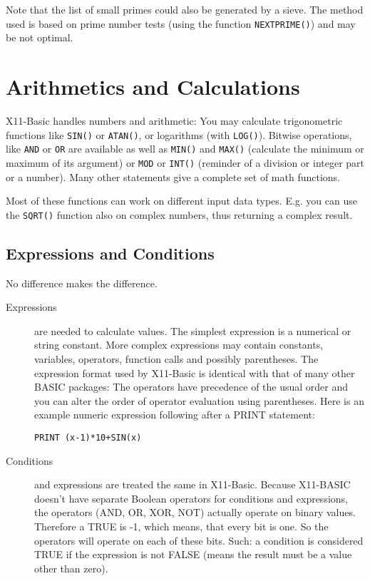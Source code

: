 Note that the list of small primes could also be generated by a sieve. The method  used
is based on prime number tests (using the function \verb|NEXTPRIME()|) and may be not
optimal.

\section{Arithmetics and Calculations}

X11-Basic handles numbers and arithmetic: You may calculate trigonometric
functions like \verb|SIN()| or \verb|ATAN()|, or logarithms (with \verb|LOG()|).
Bitwise operations, like \verb|AND| or \verb|OR| are available as well as
\verb|MIN()| and \verb|MAX()| (calculate the minimum or maximum of its argument)
or \verb|MOD| or \verb|INT()| (reminder of a division or integer part or a
number). Many other statements give a complete set of math functions. 

Most of these functions can work on different input data types. E.g. you can use the 
\verb|SQRT()| function also on complex numbers, thus returning a complex result. 

\subsection{Expressions and Conditions}
No difference makes the difference.
\begin{description}
\item[Expressions] are needed to calculate values. The simplest expression is a
numerical or string constant. More complex expressions may contain constants,
variables, operators, function calls and possibly parentheses. The expression
format used by X11-Basic is identical with that of many other BASIC packages:
The operators have precedence of the usual order and you can alter the order of
operator evaluation using parentheses. Here is an example numeric expression
following after a PRINT statement:
\begin{mdframed}[hidealllines=true,backgroundcolor=blue!20]
\begin{verbatim}
PRINT (x-1)*10+SIN(x)
\end{verbatim}
\end{mdframed}
\item[Conditions] and expressions are treated the same in X11-Basic. Because
X11-BASIC doesn't have separate Boolean operators for conditions and 
expressions, the operators (AND, OR, XOR, NOT) actually operate on binary
values. Therefore a TRUE is -1, which means, that every bit is one. So the
operators will operate on each of these bits. Such: a condition is considered
TRUE if the expression is not FALSE (means the result must be a value other than
zero).
\end{description}

